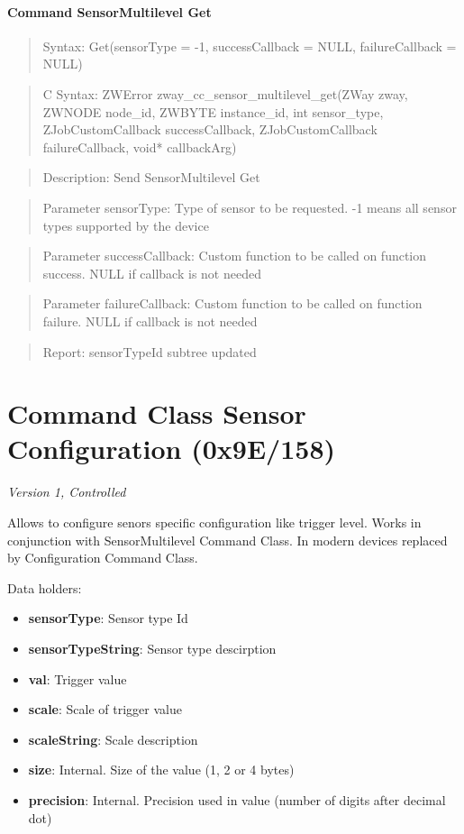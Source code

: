 \paragraph{Command SensorMultilevel Get}
\begin{quote}Syntax: Get(sensorType = -1, successCallback = NULL, failureCallback = NULL)\end{quote}
\begin{quote}C Syntax: ZWError zway\_cc\_sensor\_multilevel\_get(ZWay zway, ZWNODE node\_id, ZWBYTE instance\_id, int sensor\_type, ZJobCustomCallback successCallback, ZJobCustomCallback failureCallback, void* callbackArg)\end{quote}
\begin{quote}Description: Send SensorMultilevel Get\end{quote}
\begin{quote}Parameter sensorType: Type of sensor to be requested. -1 means all sensor types supported by the device\end{quote}
\begin{quote}Parameter successCallback: Custom function to be called on function success. NULL if callback is not needed\end{quote}
\begin{quote}Parameter failureCallback: Custom function to be called on function failure. NULL if callback is not needed\end{quote}
\begin{quote}Report: sensorTypeId subtree updated\end{quote}


\section{Command Class Sensor Configuration (0x9E/158)}

\textit{Version 1, Controlled}
\newline

Allows to configure senors specific configuration like trigger level. Works in conjunction with SensorMultilevel Command Class. In modern devices replaced by Configuration Command Class.
\newline

\noindent
Data holders:

\begin{itemize}
\item \textbf{sensorType}: Sensor type Id
\item \textbf{sensorTypeString}: Sensor type descirption
\item \textbf{val}: Trigger value
\item \textbf{scale}: Scale of trigger value
\item \textbf{scaleString}: Scale description
\item \textbf{size}: Internal. Size of the value (1, 2 or 4 bytes)
\item \textbf{precision}: Internal. Precision used in value (number of digits after decimal dot)
\end{itemize}

